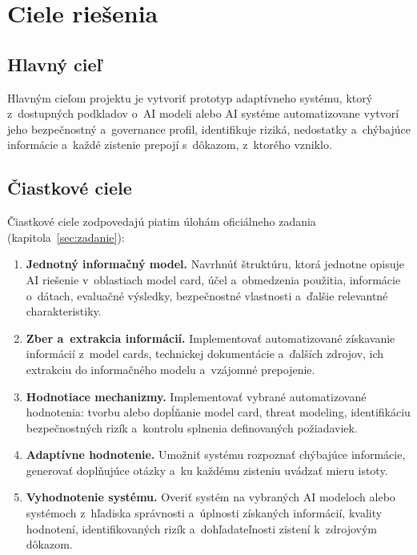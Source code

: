 \section{Ciele riešenia}
\label{sec:ciele}

\subsection{Hlavný cieľ}

Hlavným cieľom projektu je vytvoriť prototyp adaptívneho systému, ktorý
z~dostupných podkladov o~AI modeli alebo AI systéme automatizovane vytvorí
jeho bezpečnostný a~governance profil, identifikuje riziká, nedostatky
a~chýbajúce informácie a~každé zistenie prepojí s~dôkazom, z~ktorého vzniklo.

\subsection{Čiastkové ciele}

Čiastkové ciele zodpovedajú piatim úlohám oficiálneho zadania
(kapitola~\ref{sec:zadanie}):

\begin{enumerate}
    \item \textbf{Jednotný informačný model.} Navrhnúť štruktúru, ktorá
    jednotne opisuje AI riešenie v~oblastiach model card, účel a~obmedzenia
    použitia, informácie o~dátach, evaluačné výsledky, bezpečnostné
    vlastnosti a~ďalšie relevantné charakteristiky.
    \item \textbf{Zber a~extrakcia informácií.} Implementovať automatizované
    získavanie informácií z~model cards, technickej dokumentácie a~ďalších
    zdrojov, ich extrakciu do informačného modelu a~vzájomné prepojenie.
    \item \textbf{Hodnotiace mechanizmy.} Implementovať vybrané automatizované
    hodnotenia: tvorbu alebo dopĺňanie model card, threat modeling,
    identifikáciu bezpečnostných rizík a~kontrolu splnenia definovaných
    požiadaviek.
    \item \textbf{Adaptívne hodnotenie.} Umožniť systému rozpoznať chýbajúce
    informácie, generovať doplňujúce otázky a~ku každému zisteniu uvádzať
    mieru istoty.
    \item \textbf{Vyhodnotenie systému.} Overiť systém na vybraných AI modeloch
    alebo systémoch z~hľadiska správnosti a~úplnosti získaných informácií,
    kvality hodnotení, identifikovaných rizík a~dohľadateľnosti zistení
    k~zdrojovým dôkazom.
\end{enumerate}
